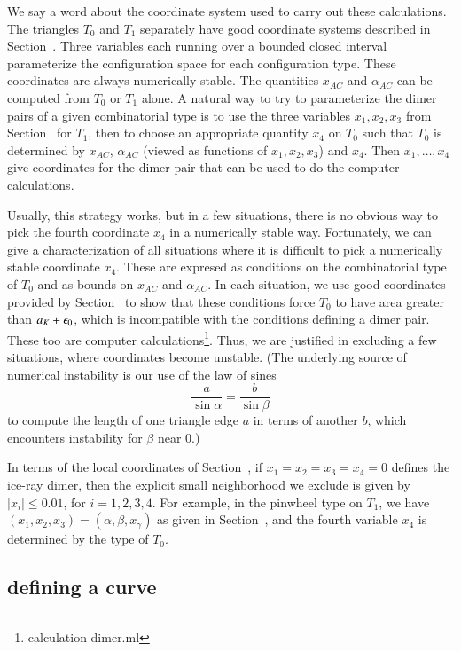 We say a word about the coordinate system used to carry out these calculations.
The triangles $T_0$ and $T_1$ separately have good coordinate systems described in Section~.  Three variables
each running over a bounded closed interval parameterize the configuration space for each configuration type.
These coordinates are always numerically stable.  The quantities $x_{AC}$ and $\alpha_{AC}$ can be computed from $T_0$ or $T_1$  alone.
A natural way to try to parameterize the dimer pairs of a given combinatorial type is to use the three variables $x_1,x_2,x_3$ from Section~ for $T_1$,
then to choose an appropriate quantity $x_4$ on $T_0$ such that $T_0$ is determined by $x_{AC}$, $\alpha_{AC}$ (viewed as functions of $x_1,x_2,x_3$) and
$x_4$.  Then $x_1,\ldots,x_4$ give coordinates for the dimer pair that can be used to do the computer calculations.

Usually, this strategy works, but in a few situations, there is no obvious way to pick the fourth coordinate $x_4$ in a numerically stable way.
Fortunately, we can give a characterization of all situations where it is difficult to pick a numerically stable coordinate $x_4$.  These are
expresed as conditions on the combinatorial type of $T_0$ and as bounds on $x_{AC}$ and $\alpha_{AC}$.  In each situation, we use good
coordinates provided by Section~ to show that
these conditions force $T_0$ to have area greater than $a_K+\epsilon_0$, which is incompatible with the conditions defining a dimer pair.  
These too are computer calculations\footnote{calculation dimer.ml}.
Thus, we are justified in excluding a few situations, where coordinates become unstable.  (The underlying source of numerical instability is
our use of the law of sines 
\[
\frac{a}{\sin\alpha} = \frac{b}{\sin\beta}
\]
to compute the length of one triangle edge $a$ in terms of another $b$, which encounters instability for $\beta$ near $0$.)

In terms of the local coordinates of Section~, if $x_1=x_2=x_3=x_4=0$ defines the ice-ray dimer, then the explicit
small neighborhood we exclude is given by $|x_i|\le 0.01$, for $i=1,2,3,4$.  For example, in the pinwheel type on $T_1$, 
we have $(x_1,x_2,x_3)=(\alpha,\beta,x_\gamma)$ as given in Section~, and the fourth variable $x_4$ is determined
by the type of $T_0$.

\subsection{defining a curve}\label{sec:gamma}

